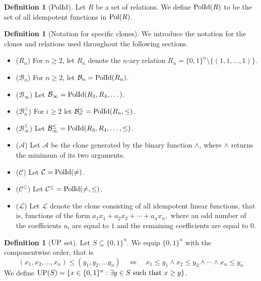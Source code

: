 \documentclass{amsart}
\numberwithin{equation}{section}
\theoremstyle{plain}
\theoremstyle{definition}
\newtheorem{definition}[theorem]{Definition}
\def\relation#1{#1}
\def\clone#1{\mathcal{#1}}
\def\Bc{\clone{B}}
\def\Ac{\clone{A}}
\def\Lc{\clone{L}}
\def\Cc{\clone{C}}
\def\Pol{{\rm Pol}}
\def\PolId{{\rm PolId}}
\def\UP{{\rm UP}}
\begin{document}
\begin{definition}[$\PolId$] Let $R$ be a set of relations. We define $\PolId(R)$ to be the set of all idempotent functions in $\Pol(R)$. \end{definition}

\begin{definition}[Notation for specific clones]
We introduce the notation for the clones and relations used throughout the following sections.
\begin{itemize}
\item ($\relation{R}_n$) For $n\geq 2$, let $\relation{R}_n$ denote the $n$-ary relation $\relation{R}_n = \{0,1\}^n\setminus \{(1,1,\dots,1)\}.$
\item ($\Bc_n$) For $n\geq 2$, let $\Bc_n =\PolId(\relation{R}_n)$.
\item ($\Bc_{\infty}$) Let $\Bc_{\infty} = \PolId(\relation{R}_{3},\relation{R}_{4},\dots)$.
\item ($\Bc_n^{\leq}$) For $i\geq 2$ let $\Bc_n^{\leq} =\PolId(\relation{R}_n,\leq)$.
\item ($\Bc_{\infty}^{\leq}$) Let $\Bc_{\infty}^{\leq} = \PolId(\relation{R_3}, \relation{R}_4,\dots,\leq)$.
\item ($\Ac$) Let $\Ac$ be the clone generated by the binary function $\wedge$, where $\wedge$ returns the minimum of its two arguments.
\item ($\Cc$) Let $\Cc = \PolId(\neq)$.
\item ($\Cc^{\leq}$) Let  $\Cc^{\leq} = \PolId(\neq,\leq)$.
\item ($\Lc$) Let $\Lc$ denote the clone consisting of all idempotent linear functions, that is, functions of the form $a_1x_1+a_2x_2+\cdots+a_nx_n,$ where an odd number of the coefficients $a_i$ are equal to $1$ and the remaining coefficients are equal to $0$.
\end{itemize}
\end{definition}

\begin{definition}[$\UP$ set]
Let $S\subseteq \{0,1\}^n$. We equip $\{0,1\}^n$ with the componentwise order, that is
$$(x_1,x_2,\dots, x_n) \leq (y_1,y_2,\dots y_n) \quad \Leftrightarrow \quad x_1\leq y_1 \wedge x_2\leq y_2 \wedge \cdots\wedge x_n\leq y_n$$
We define $\UP(S)=\{x\in\{0,1\}^n : \exists y\in S \text{ such that } x\geq y\}$.
\end{definition}
\end{document}
